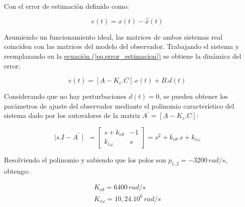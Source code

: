 \documentclass{article}
\begin{document}
Con el error de estimación definido como:

\begin{equation}\label{eq.error_estimacion}
    e(t) = x(t) - \hat{x}(t)
\end{equation}

Asumiendo un funcionamiento ideal, las matrices de ambos sistemas real coinciden con las matrices del
modelo del observador. Trabajando el sistema y reemplazando en la   
\hyperref[eq.error_estimacion]{ecuación (\ref*{eq.error_estimacion})}
se obtiene la dinámica del error:

\begin{equation}
    \dot{e}(t) = [A - K_e.C].e(t) + B.d(t)
\end{equation}

Considerando que no hay perturbaciones $d(t) = 0$, se pueden obtener los parámetros de ajuste del observador
mediante el polinomio característico del sistema dado por los autovalores de la matriz 
$A^\prime = [A - K_e.C]$:

\begin{equation}
    \mid s.I - A^\prime\mid \,\,= 
    \begin{bmatrix}
        s + k_{e\theta} & -1 \\
        k_{e\omega} & s 
    \end{bmatrix}
    = s^2 + k_{e\theta}.s + k_{e\omega}
\end{equation}

Resolviendo el polinomio y sabiendo que los polos son $p_{1,2} = -3200\, rad/s$, obtengo:

\begin{align*}
    K_{e\theta} = 6400\,rad/s \\
    K_{e\omega} = 10,24.10^6\,rad/s
\end{align*}

\end{document}
